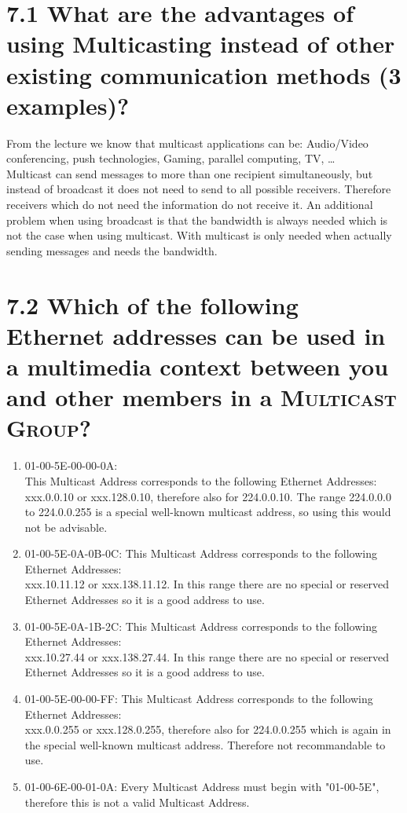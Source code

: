 \documentclass{article}
\begin{document}
	\pagestyle{fancy}
	\hfill
	
	\section*{7.1 What are the advantages of using Multicasting instead of other existing communication methods (3 examples)?}
	\begin{adjustwidth}{2em}{2em}
		From the lecture we know that multicast applications can be: Audio/Video conferencing, push technologies, Gaming, parallel computing, TV, … \\
		Multicast can send messages to more than one recipient simultaneously, but instead of broadcast it does not need to send to all possible receivers. Therefore receivers which do not need the information do not receive it. An additional problem when using broadcast is that the bandwidth is always needed which is not the case when using multicast. With multicast is only needed when actually sending messages and needs the bandwidth.
	\end{adjustwidth}
	
	\section*{7.2 Which of the following Ethernet addresses can be used in a multimedia context between you and other members in a \textsc{Multicast Group}?}
	\begin{adjustwidth}{2em}{2em}
		\begin{enumerate}
			\item 01-00-5E-00-00-0A: \\
			This Multicast Address corresponds to the following Ethernet Addresses: \\
			xxx.0.0.10 or xxx.128.0.10, therefore also for 224.0.0.10. The range 224.0.0.0 to 224.0.0.255 is a special well-known multicast address, so using this would not be advisable.
			\item 01-00-5E-0A-0B-0C:
			This Multicast Address corresponds to the following Ethernet Addresses: \\
			xxx.10.11.12 or xxx.138.11.12. In this range there are no special or reserved Ethernet Addresses so it is a good address to use.
			\item 01-00-5E-0A-1B-2C:
			This Multicast Address corresponds to the following Ethernet Addresses: \\
			xxx.10.27.44 or xxx.138.27.44. In this range there are no special or reserved Ethernet Addresses so it is a good address to use.
			\item 01-00-5E-00-00-FF:
			This Multicast Address corresponds to the following Ethernet Addresses: \\
			xxx.0.0.255 or xxx.128.0.255, therefore also for 224.0.0.255 which is again in the special well-known multicast address. Therefore not recommandable to use.
			\item 01-00-6E-00-01-0A:
			Every Multicast Address must begin with "01-00-5E", therefore this is not a valid Multicast Address.
		\end{enumerate}
	\end{adjustwidth}
	
\end{document}
